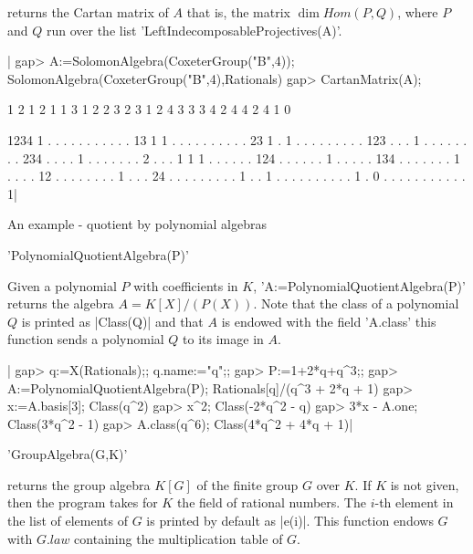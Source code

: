 returns  the Cartan matrix of $A$ that  is, the matrix $\dim Hom(P,Q)$, where
$P$ and $Q$ run over the list 'LeftIndecomposableProjectives(A)'.

|    gap> A:=SolomonAlgebra(CoxeterGroup("B",4));
    SolomonAlgebra(CoxeterGroup("B",4),Rationals)
    gap> CartanMatrix(A);

           1
           2        1  2     1  1
           3  1  2  2  3     2  3  1  2
           4  3  3  3  4  2  4  4  2  4  1  0

    1234   1  .  .  .  .  .  .  .  .  .  .  .
      13   1  1  .  .  .  .  .  .  .  .  .  .
      23   1  .  1  .  .  .  .  .  .  .  .  .
     123   .  .  .  1  .  .  .  .  .  .  .  .
     234   .  .  .  .  1  .  .  .  .  .  .  .
       2   .  .  .  1  1  1  .  .  .  .  .  .
     124   .  .  .  .  .  .  1  .  .  .  .  .
     134   .  .  .  .  .  .  .  1  .  .  .  .
      12   .  .  .  .  .  .  .  .  1  .  .  .
      24   .  .  .  .  .  .  .  .  .  1  .  .
       1   .  .  .  .  .  .  .  .  .  .  1  .
       0   .  .  .  .  .  .  .  .  .  .  .  1|

An example - quotient by polynomial algebras

'PolynomialQuotientAlgebra(P)'

Given a polynomial $P$ with coefficients in $K$,
'A:=PolynomialQuotientAlgebra(P)' returns the algebra $A=K[X]/(P(X))$. Note
that the class of a polynomial $Q$ is printed as |Class(Q)| and that $A$ is
endowed  with the field 'A.class'\: this function sends a polynomial $Q$ to
its image in $A$.

|    gap> q:=X(Rationals);; q.name:="q";;
    gap> P:=1+2*q+q^3;;
    gap> A:=PolynomialQuotientAlgebra(P);
    Rationals[q]/(q^3 + 2*q + 1)
    gap> x:=A.basis[3];
    Class(q^2)
    gap> x^2;
    Class(-2*q^2 - q)
    gap> 3*x - A.one;
    Class(3*q^2 - 1)
    gap> A.class(q^6);
    Class(4*q^2 + 4*q + 1)|


'GroupAlgebra(G,K)'

returns  the group algebra $K[G]$ of the  finite group $G$ over $K$. If $K$
is not given, then the program takes for $K$ the field of rational numbers.
The  $i$-th element in the list of elements of $G$ is printed by default as
|e(i)|. This function endows $G$ with $G.law$ containing the multiplication
table of $G$.

